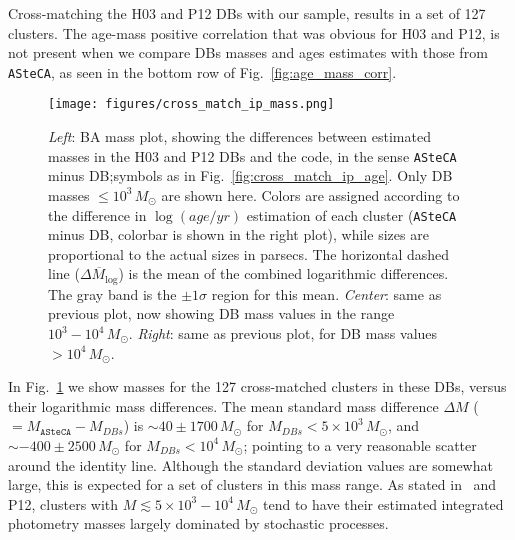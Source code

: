 \documentclass[draft]{aa}
\begin{document}
Cross-matching the H03 and P12 DBs with our sample, results in a
set of 127 clusters. The age-mass positive correlation that was obvious for H03
and P12, is not present when we compare DBs masses and ages estimates with
those from \texttt{ASteCA}, as seen in the bottom row of
Fig.~\ref{fig:age_mass_corr}.
%
\begin{figure*}
\texttt{[image: figures/cross\_match\_ip\_mass.png]}
\caption{\emph{Left}: BA mass plot, showing the differences between estimated
masses in the H03 and P12 DBs and the code, in the sense \texttt{ASteCA} minus
DB;\@ symbols as in Fig.~\ref{fig:cross_match_ip_age}.
Only DB masses ${\le}10^3\,M_{\odot}$ are shown here.
Colors are assigned according to the difference in $\log(age/yr)$ estimation of
each cluster (\texttt{ASteCA} minus DB, colorbar is shown in the right plot),
while sizes are proportional to the actual sizes in parsecs.
The horizontal dashed line ($\overline{\Delta M_{\log}}$) is the mean of the
combined logarithmic differences. The gray band is the ${\pm}1\sigma$ region for
this mean.
\emph{Center}: same as previous plot, now showing DB mass values in the range
$10^3-10^4\,M_{\odot}$.
\emph{Right}: same as previous plot, for DB mass values ${>}10^4\,M_{\odot}$.
}
\label{fig:cross_match_ip_mass}
\end{figure*}
%
In Fig.~\ref{fig:cross_match_ip_mass} we show masses for the 127 cross-matched
clusters in these DBs, versus their logarithmic mass differences.
%
The mean standard mass difference $\Delta M$ (${=}M_{\mathtt{ASteCA}}-M_{DBs}$)
is ${\sim}40{\pm}1700\,M_{\odot}$ for $M_{DBs} {<}5{\times}10^3\,M_{\odot}$,
and ${\sim-}400{\pm}2500\,M_{\odot}$ for $M_{DBs} {<}10^4\,M_{\odot}$; pointing
to a very reasonable scatter around the identity line.
%
Although the standard deviation values are somewhat large, this is expected for
a set of clusters in this mass range. As stated in~\cite{Baumgardt_2013} and
P12, clusters with $M{\lesssim}5{\times}10^3 - 10^4\,M_{\odot}$ tend to have
their estimated integrated photometry masses largely dominated by
stochastic processes.
\end{document}
